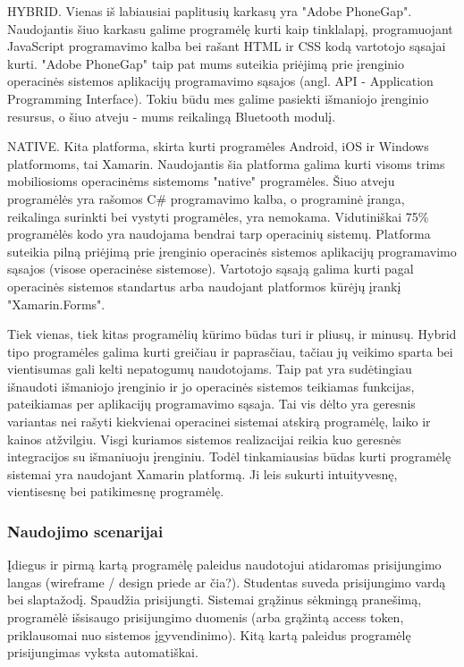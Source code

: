 \documentclass{VUMIFPSkursinis}
\begin{document}

HYBRID. Vienas iš labiausiai paplitusių karkasų yra "Adobe PhoneGap". Naudojantis šiuo karkasu galime programėlę kurti kaip tinklalapį, programuojant JavaScript programavimo kalba bei rašant HTML ir CSS kodą vartotojo sąsajai kurti. "Adobe PhoneGap" taip pat mums suteikia priėjimą prie įrenginio operacinės sistemos aplikacijų programavimo sąsajos (angl. API - Application Programming Interface). Tokiu būdu mes galime pasiekti išmaniojo įrenginio resursus, o šiuo atveju - mums reikalingą Bluetooth modulį.


NATIVE. Kita platforma, skirta kurti programėles Android, iOS ir Windows platformoms, tai Xamarin. Naudojantis šia platforma galima kurti visoms trims mobiliosioms operacinėms sistemoms "native" programėles. Šiuo atveju programėlės yra rašomos C\# programavimo kalba, o programinė įranga, reikalinga surinkti bei vystyti programėles, yra nemokama. Vidutiniškai 75\% programėlės kodo yra naudojama bendrai tarp operacinių sistemų. Platforma suteikia pilną priėjimą prie įrenginio operacinės sistemos aplikacijų programavimo sąsajos (visose operacinėse sistemose). Vartotojo sąsają galima kurti pagal operacinės sistemos standartus arba naudojant platformos kūrėjų įrankį "Xamarin.Forms".


Tiek vienas, tiek kitas programėlių kūrimo būdas turi ir pliusų, ir minusų. Hybrid tipo programėles galima kurti greičiau ir paprasčiau, tačiau jų veikimo sparta bei vientisumas gali kelti nepatogumų naudotojams. Taip pat yra sudėtingiau išnaudoti išmaniojo įrenginio ir jo operacinės sistemos teikiamas funkcijas, pateikiamas per aplikacijų programavimo sąsaja. Tai vis dėlto yra geresnis variantas nei rašyti kiekvienai operacinei sistemai atskirą programėlę, laiko ir kainos atžvilgiu. Visgi kuriamos sistemos realizacijai reikia kuo geresnės integracijos su išmaniuoju įrenginiu. Todėl tinkamiausias būdas kurti programėlę sistemai yra naudojant Xamarin platformą. Ji leis sukurti intuityvesnę, vientisesnę bei patikimesnę programėlę.

\subsubsection{Naudojimo scenarijai}


Įdiegus ir pirmą kartą programėlę paleidus naudotojui atidaromas prisijungimo langas (wireframe / design priede ar čia?). Studentas suveda prisijungimo vardą bei slaptažodį. Spaudžia prisijungti. Sistemai grąžinus sėkmingą pranešimą, programėlė išsisaugo prisijungimo duomenis (arba grąžintą access token, priklausomai nuo sistemos įgyvendinimo). Kitą kartą paleidus programėlę prisijungimas vyksta automatiškai.
\end{document}
